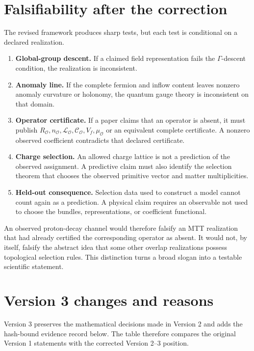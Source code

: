 \documentclass[11pt]{article}
\newcommand{\Line}{\mathcal{L}}
\newcommand{\Coeff}{\mathcal{C}}
\newcommand{\Ops}{\mathcal{O}}
\begin{document}
\section{Falsifiability after the correction}

The revised framework produces sharp tests, but each test is conditional on
a declared realization.

\begin{enumerate}[label=\textbf{F\arabic*.}]
\item \textbf{Global-group descent.}
If a claimed field representation fails the \(\Gamma\)-descent condition,
the realization is inconsistent.
\item \textbf{Anomaly line.}
If the complete fermion and inflow content leaves nonzero anomaly curvature
or holonomy, the quantum gauge theory is inconsistent on that domain.
\item \textbf{Operator certificate.}
If a paper claims that an operator is absent, it must publish
\(R_{\Ops},n_{\Ops},\Line_{\Ops},\Coeff_{\Ops},V_f,\mu_{\Ops}\) or an
equivalent complete certificate. A nonzero observed coefficient contradicts
that declared certificate.
\item \textbf{Charge selection.}
An allowed charge lattice is not a prediction of the observed assignment.
A predictive claim must also identify the selection theorem that chooses
the observed primitive vector and matter multiplicities.
\item \textbf{Held-out consequence.}
Selection data used to construct a model cannot count again as a prediction.
A physical claim requires an observable not used to choose the bundles,
representations, or coefficient functional.
\end{enumerate}

An observed proton-decay channel would therefore falsify an MTT realization
that had already certified the corresponding operator as absent. It would
not, by itself, falsify the abstract idea that some other overlap
realizations possess topological selection rules. This distinction turns a
broad slogan into a testable scientific statement.

\section{Version 3 changes and reasons}

Version 3 preserves the mathematical decisions made in Version 2 and adds
the hash-bound evidence record below. The table therefore compares the
original Version 1 statements with the corrected Version 2--3 position.
\end{document}
